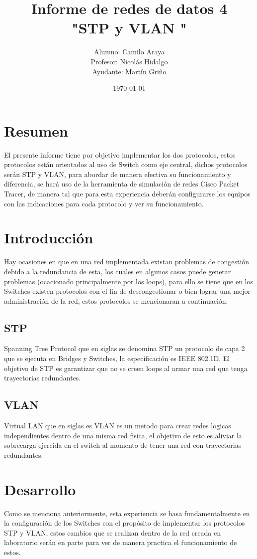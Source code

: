 \documentclass[spanish]{udpreport}
\title{Informe de redes de datos 4\\
"STP y VLAN "\\}
\author{Alumno: Camilo Araya
\\Profesor: Nicolás Hidalgo\\Ayudante: Martín Griño}
\date{\today}
\begin{document}
\maketitle

\chapter*{Resumen} 
El presente informe tiene por objetivo implementar los dos protocolos, estos protocolos están orientados al uso de Switch como eje central, dichos protocolos serán STP y VLAN, para abordar de manera efectiva su funcionamiento y diferencia, se hará uso de la herramienta de simulación de redes Cisco Packet Tracer, de manera tal que para esta experiencia deberán configurarse los equipos con las indicaciones para cada protocolo y ver su funcionamiento.

\tableofcontents
\chapter{Introducción}
Hay ocasiones en que en una red implementada existan problemas de congestión debido a la redundancia de esta, los cuales en algunos casos puede generar problemas (ocacionado principalmente por los loops), para ello se tiene que en los Switches existen protocolos con el fin de descongestionar o bien lograr una mejor administración de la red, estos protocolos se mencionaran a continuación:
\section{STP}
Spanning Tree Protocol que en siglas se denomina STP un protocolo de capa 2 que se ejecuta en Bridges y Switches, la especificación es IEEE 802.1D. El objetivo de STP es garantizar que no se creen loops al armar una red que tenga trayectorias redundantes.
\section{VLAN}
Virtual LAN que en siglas es VLAN es un metodo para crear redes logicas independientes dentro de una misma red fisica, el objetivo de esto es aliviar la sobrecarga ejercida en el switch al momento de tener una red con trayectorias redundantes.

\chapter{Desarrollo}
Como se menciona anteriormente, esta experiencia se basa fundamentalmente en la configuración de los Switches con el propósito de implementar los protocolos STP y VLAN, estos cambios que se realizan dentro de la red creada en laboratorio serán en parte para ver de manera practica el funcionamiento de estos.
\end{document}
